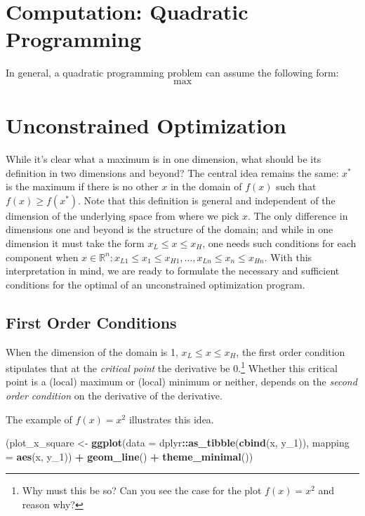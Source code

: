 \documentclass[11pt,]{article}
\newenvironment{Shaded}{\begin{snugshade}}{\end{snugshade}}
\newcommand{\KeywordTok}[1]{\textcolor[rgb]{0.13,0.29,0.53}{\textbf{#1}}}
\newcommand{\DataTypeTok}[1]{\textcolor[rgb]{0.13,0.29,0.53}{#1}}
\newcommand{\DecValTok}[1]{\textcolor[rgb]{0.00,0.00,0.81}{#1}}
\newcommand{\StringTok}[1]{\textcolor[rgb]{0.31,0.60,0.02}{#1}}
\newcommand{\OperatorTok}[1]{\textcolor[rgb]{0.81,0.36,0.00}{\textbf{#1}}}
\newcommand{\NormalTok}[1]{#1}
\let\rmarkdownfootnote\footnote%
\def\footnote{\protect\rmarkdownfootnote}
\begin{document}
\section{Computation: Quadratic
Programming}\label{computation-quadratic-programming}

In general, a quadratic programming problem can assume the following
form: \[\max{} \]

\section{Unconstrained Optimization}\label{unconstrained-optimization}

While it's clear what a maximum is in one dimension, what should be its
definition in two dimensions and beyond? The central idea remains the
same: \(x^*\) is the maximum if there is no other \(x\) in the domain of
\(f(x)\) such that \(f(x)\geq f(x^*)\). Note that this definition is
general and independent of the dimension of the underlying space from
where we pick \(x\). The only difference in dimensions one and beyond is
the structure of the domain; and while in one dimension it must take the
form \(x_L\leq x\leq x_H\), one needs such conditions for each component
when
\(x\in \mathbb{R}^n: x_{L1}\leq x_1\leq x_{H1}, \hdots, x_{Ln}\leq x_n\leq x_{Hn}\).
With this interpretation in mind, we are ready to formulate the
necessary and sufficient conditions for the optimal of an unconstrained
optimization program.

\subsection{First Order Conditions}\label{first-order-conditions}

When the dimension of the domain is 1, \(x_L\leq x\leq x_H\), the first
order condition stipulates that at the \emph{critical point} the
derivative be 0.\footnote{Why must this be so? Can you see the case for
  the plot \(f(x) = x^2\) and reason why?} Whether this critical point
is a (local) maximum or (local) minimum or neither, depends on the
\emph{second order condition} on the derivative of the derivative.

The example of \(f(x) = x^2\) illustrates this idea.

\begin{Shaded}
\begin{Highlighting}[]
\NormalTok{(plot_x_square <-}\StringTok{ }\KeywordTok{ggplot}\NormalTok{(}\DataTypeTok{data =}\NormalTok{ dplyr}\OperatorTok{::}\KeywordTok{as_tibble}\NormalTok{(}\KeywordTok{cbind}\NormalTok{(x, y_}\DecValTok{1}\NormalTok{)),}
       \DataTypeTok{mapping =} \KeywordTok{aes}\NormalTok{(x, y_}\DecValTok{1}\NormalTok{)) }\OperatorTok{+}
\StringTok{  }\KeywordTok{geom_line}\NormalTok{() }\OperatorTok{+}
\StringTok{  }\KeywordTok{theme_minimal}\NormalTok{())}
\end{Highlighting}
\end{Shaded}
\end{document}
